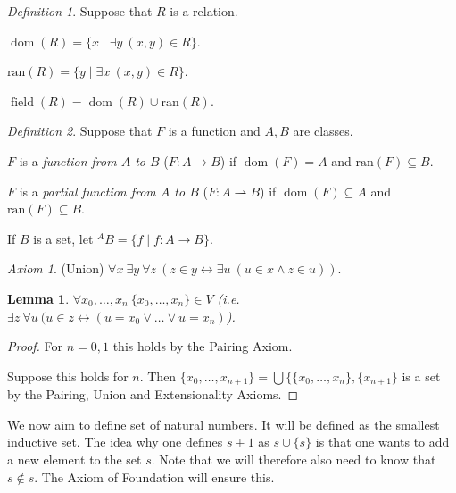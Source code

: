 \documentclass[a4paper, 11pt]{amsart}
\newtheorem{lemma}[lemma]{Lemma}
\theoremstyle{remark}
\newtheorem{definition}[definition]{Definition}
\newtheorem*{axiom}{Axiom}
\DeclareMathOperator{\dom}{dom}
\DeclareMathOperator{\field}{field}
\newcommand{\ran}{\mathrm{ran}}
\newenvironment{enumerate-(1)}{\begin{enumerate}[label={\upshape (\arabic*)}, leftmargin=2pc]}{\end{enumerate}}
\begin{document}


\begin{definition} 
Suppose that $R$ is a relation. 
\begin{enumerate-(1)}
\item 
$\dom(R)=\{ x\mid \exists y\ (x,y)\in R\} $. 
\item 
$\ran(R)=\{ y\mid \exists x\ (x,y)\in R\} $. 
\item 
$\field(R)=\dom(R)\cup \ran(R)$. 
\end{enumerate-(1)}
\end{definition} 

\begin{definition} 
Suppose that $F$ is a function and $A,B$ are classes.  
\begin{enumerate-(1)}
\item 
$F$ is a \emph{function from $A$ to $B$} ($F\colon A\rightarrow B$) if $\dom(F)=A$ and $\ran(F)\subseteq B$. 
\item 
$F$ is a \emph{partial function from $A$ to $B$} ($F\colon A\rightharpoonup B$) if $\dom(F)\subseteq A$ and $\ran(F)\subseteq B$. 
\item 
{\color{blue} If $B$ is a set,} let 
${}^A B=\{f\mid f\colon A\rightarrow B\}$. 
\end{enumerate-(1)}
\end{definition} 

\begin{axiom}(Union) 
$\forall x\ \exists y\ \forall z\ (z\in y \leftrightarrow \exists u\ (u\in x \wedge z\in u))$. 
\end{axiom} 

\begin{lemma} 
\label{finite sets exists} 
$\forall x_0,\dots,x_n\ \{x_0,\dots,x_n\}\in V $  (i.e. $\exists z\ \forall u\ (u\in z \leftrightarrow (u= x_0 \vee \dots \vee u=x_n)$).
\end{lemma} 
\begin{proof} 
For $n=0,1$ this holds by the Pairing Axiom. 

Suppose this holds for $n$. Then $\{x_0,\dots,x_{n+1}\}=\bigcup\{\{x_0,\dots,x_n\},\{x_{n+1}\}$ is a set by the Pairing, Union and Extensionality Axioms. 
\end{proof} 

We now aim to define set of natural numbers. 
It will be defined as the smallest inductive set. 
The idea why one defines $s+1$ as $s\cup \{s\}$ is that one wants to add a new element to the set $s$. 
Note that we will therefore also need to know that $s\notin s$. 
The Axiom of Foundation will ensure this. 
\end{document}

